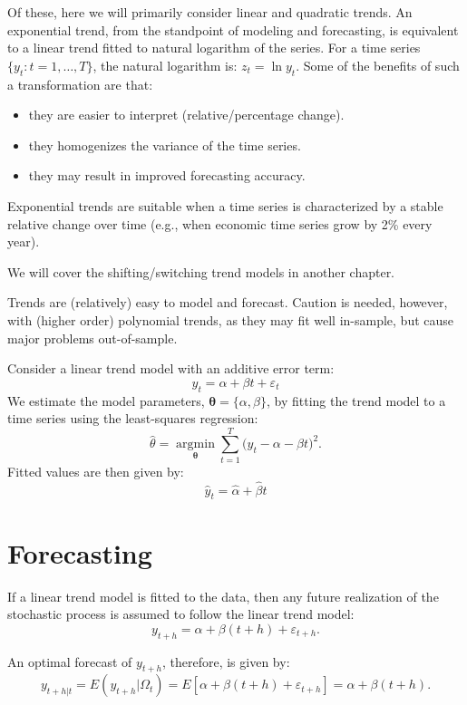 \documentclass[
  oneside]{book}
\providecommand{\tightlist}{%
  \setlength{\itemsep}{0pt}\setlength{\parskip}{0pt}}
\begin{document}
Of these, here we will primarily consider linear and quadratic trends. An exponential trend, from the standpoint of modeling and forecasting, is equivalent to a linear trend fitted to natural logarithm of the series. For a time series \(\{y_t: t=1,\ldots,T\}\), the natural logarithm is: \(z_t = \ln{y_t}\). Some of the benefits of such a transformation are that:

\begin{itemize}
\tightlist
\item
  they are easier to interpret (relative/percentage change).
\item
  they homogenizes the variance of the time series.
\item
  they may result in improved forecasting accuracy.
\end{itemize}

Exponential trends are suitable when a time series is characterized by a stable relative change over time (e.g., when economic time series grow by 2\% every year).

We will cover the shifting/switching trend models in another chapter.

Trends are (relatively) easy to model and forecast. Caution is needed, however, with (higher order) polynomial trends, as they may fit well in-sample, but cause major problems out-of-sample.

Consider a linear trend model with an additive error term: \[y_t = \alpha + \beta t + \varepsilon_t\] We estimate the model parameters, \(\mathbf{\theta}=\{\alpha,\beta\}\), by fitting the trend model to a time series using the least-squares regression: \[\hat{\theta} = \operatorname*{argmin}_{\mathbf{\theta}} \sum_{t=1}^{T}\big(y_t - \alpha - \beta t\big)^2.\] Fitted values are then given by: \[\hat{y}_t = \hat{\alpha} + \hat{\beta} t\]

\hypertarget{forecasting}{%
\section{Forecasting}\label{forecasting}}

If a linear trend model is fitted to the data, then any future realization of the stochastic process is assumed to follow the linear trend model: \[y_{t+h} = \alpha + \beta (t+h) + \varepsilon_{t+h}.\]

An optimal forecast of \(y_{t+h}\), therefore, is given by: \[y_{t+h|t} = E(y_{t+h}|\Omega_t) = E[\alpha + \beta (t+h) + \varepsilon_{t+h}] = \alpha + \beta (t+h).\]
\end{document}
